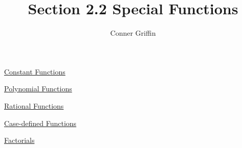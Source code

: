 \documentclass{ximera}
\title{Section 2.2 Special Functions}
\author{Conner Griffin}
\begin{document}
\begin{abstract}
    
\end{abstract}
\maketitle

\underline{Constant Functions}



\underline{Polynomial Functions}



\underline{Rational Functions}



\underline{Case-defined Functions}



\underline{Factorials}


\end{document}
